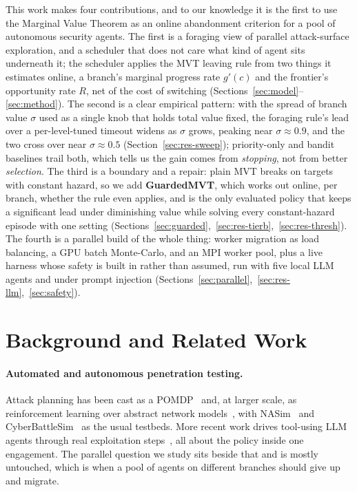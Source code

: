 \documentclass[runningheads]{llncs}
\newcommand{\gprime}{g'(c)}
\newcommand{\RR}{R}
\begin{document}
This work makes four contributions, and to our knowledge it is the first to use the
Marginal Value Theorem as an online abandonment criterion for a pool of autonomous
security agents. The first is a foraging view of parallel attack-surface exploration, and
a scheduler that does not care what kind of agent sits underneath it; the scheduler
applies the MVT leaving rule from two things it estimates online, a branch's marginal
progress rate $\gprime$ and the frontier's opportunity rate $\RR$, net of the cost of
switching (Sections~\ref{sec:model}--\ref{sec:method}). The second is a clear empirical
pattern: with the spread of branch value $\sigma$ used as a single knob that holds total
value fixed, the foraging rule's lead over a per-level-tuned timeout widens as $\sigma$
grows, peaking near $\sigma\approx 0.9$, and the two cross over near $\sigma\approx 0.5$
(Section~\ref{sec:res-sweep}); priority-only and bandit baselines trail both, which tells
us the gain comes from \emph{stopping}, not from better \emph{selection}. The third is a
boundary and a repair: plain MVT breaks on targets with constant hazard, so we add
\textbf{GuardedMVT}, which works out online, per branch, whether the rule even applies,
and is the only evaluated policy that keeps a significant lead under diminishing value while
solving every constant-hazard episode with one setting
(Sections~\ref{sec:guarded},~\ref{sec:res-tierb},~\ref{sec:res-thresh}). The fourth is a parallel build of the
whole thing: worker migration as load balancing, a GPU batch Monte-Carlo, and an MPI
worker pool, plus a live harness whose safety is built in rather than assumed, run with
five local LLM agents and under prompt injection
(Sections~\ref{sec:parallel},~\ref{sec:res-llm},~\ref{sec:safety}).

\section{Background and Related Work}
\label{sec:related}

\paragraph{Automated and autonomous penetration testing.}
Attack planning has been cast as a POMDP~\cite{sarraute2012pomdp} and, at larger scale,
as reinforcement learning over abstract network
models~\cite{schwartz2019autonomous,hu2020automated,ghanem2020reinforcement}, with
NASim~\cite{nasim2019} and CyberBattleSim~\cite{cyberbattlesim2021} as the usual
testbeds. More recent work drives tool-using LLM agents through real exploitation
steps~\cite{deng2024pentestgpt}, all about the policy inside one engagement. The parallel question we study
sits beside that and is mostly untouched, which is when a pool of agents on different
branches should give up and migrate.
\end{document}
